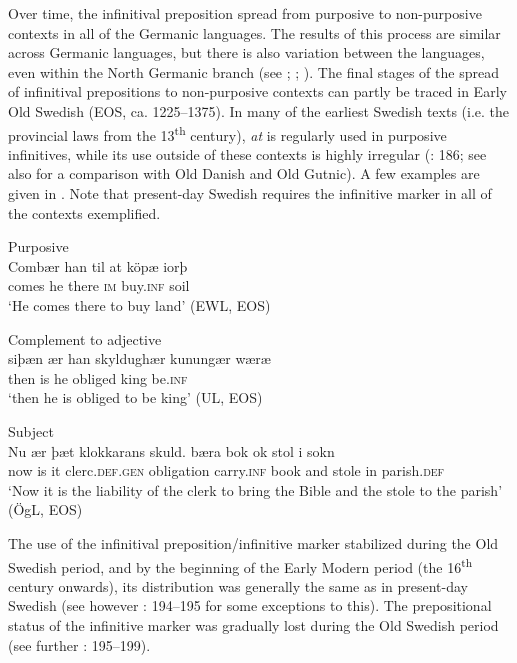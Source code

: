 \documentclass[output=paper]{langscibook}
\begin{document}
Over time, the infinitival preposition spread from purposive to non-purposive contexts in all of the Germanic languages. The results of this process are similar across Germanic languages, but there is also variation between the languages, even within the North Germanic branch (see \citealt{Haspelmath1989}; \citealt{Los2005}; \citealt{Kalm2016Prepositioner, Kalm2016Satsekvivalenta,Kalm2019}). The final stages of the spread of infinitival prepositions to non-purposive contexts can partly be traced in Early Old Swedish (EOS, ca. 1225–1375). In many of the earliest Swedish texts (i.e. the provincial laws from the 13\textsuperscript{th} century), \textit{at} is regularly used in purposive infinitives, while its use outside of these contexts is highly irregular (\citealt{Kalm2016Satsekvivalenta}: 186; see also \citealt{Kalm2019} for a comparison with Old Danish and Old Gutnic). A few examples are given in . Note that present-day Swedish requires the infinitive marker in all of the contexts exemplified. 


\ea
\label{ex:kalm:4}
\ea Purposive\\\label{ex:kalm:4a}
\gll Combær han til at köpæ iorþ\\ 
comes he there \textsc{im} buy.\textsc{inf} soil\\
\glt‘He comes there to buy land’ (EWL, EOS) 

\ex Complement to adjective\\\label{ex:kalm:4b}
\gll siþæn ær han skyldughær kunungær wæræ\\
 then is he obliged king be.\textsc{inf}\\
\glt ‘then he is obliged to be king’ (UL, EOS)
 
\ex Subject\\\label{ex:kalm:4c}
\gll Nu ær þæt klokkarans skuld. bæra bok ok stol i sokn\\
now is it clerc.\textsc{def.gen} obligation carry.\textsc{inf} book and stole in parish.\textsc{def}\\
\glt ‘Now it is the liability of the clerk to bring the Bible and the stole to the parish’ (ÖgL, EOS)

\z 
\z 



The use of the infinitival preposition/infinitive marker stabilized during the Old Swedish period, and by the beginning of the Early Modern period (the 16\textsuperscript{th} century onwards), its distribution was generally the same as in present-day Swedish (see however \citealt{Hellquist1902}: 194–195 for some exceptions to this). The prepositional status of the infinitive marker was gradually lost during the Old Swedish period (see further \citealt{Kalm2016Satsekvivalenta}: 195–199). 
\end{document}
